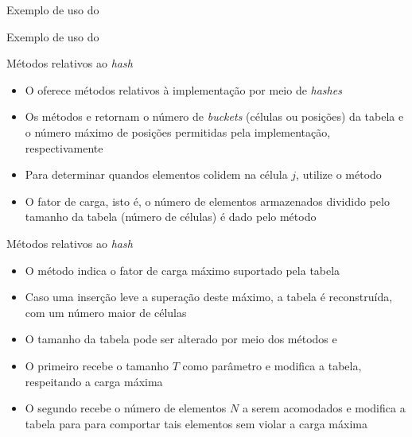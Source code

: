 \begin{frame}[fragile]{Exemplo de uso do }
\end{frame}

\begin{frame}[fragile]{Exemplo de uso do }
\end{frame}

\begin{frame}[fragile]{Métodos relativos ao {\it hash}}

    \begin{itemize}
        \item O  oferece métodos relativos à implementação por meio de
            \textit{hashes}

        \item Os métodos  e  retornam
            o número de \textit{buckets} (células ou posições) da tabela e o número máximo de
            posições permitidas pela implementação, respectivamente

        \item Para determinar quandos elementos colidem na célula $j$, utilize o método

        \item O fator de carga, isto é, o número de elementos armazenados dividido pelo
            tamanho da tabela (número de células) é dado pelo método 

    \end{itemize}

\end{frame}

\begin{frame}[fragile]{Métodos relativos ao {\it hash}}

    \begin{itemize}
        \item O método  indica o fator de carga máximo suportado
            pela tabela

        \item Caso uma inserção leve a superação deste máximo, a tabela é reconstruída, com um
            número maior de células

        \item O tamanho da tabela pode ser alterado por meio dos métodos 
            e 

        \item O primeiro recebe o tamanho $T$ como parâmetro e modifica a tabela, respeitando
            a carga máxima

        \item O segundo recebe o número de elementos $N$ a serem acomodados e modifica a tabela
            para para comportar tais elementos sem violar a carga máxima
    \end{itemize}

\end{frame}

